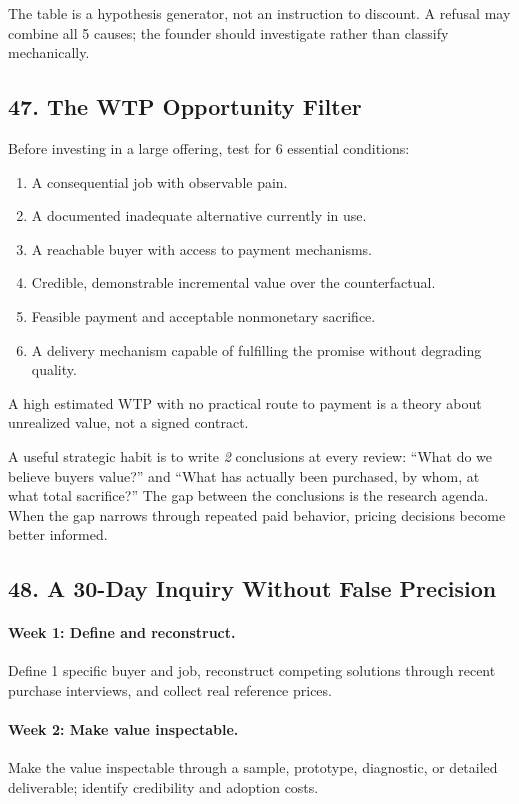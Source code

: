 The table is a hypothesis generator, not an instruction to discount. A refusal may combine all 5 causes; the founder should investigate rather than classify mechanically.

\subsection*{47. The WTP Opportunity Filter}

Before investing in a large offering, test for 6 essential conditions:
\begin{enumerate}
\item A consequential job with observable pain.
\item A documented inadequate alternative currently in use.
\item A reachable buyer with access to payment mechanisms.
\item Credible, demonstrable incremental value over the counterfactual.
\item Feasible payment and acceptable nonmonetary sacrifice.
\item A delivery mechanism capable of fulfilling the promise without degrading quality.
\end{enumerate}

A high estimated WTP with no practical route to payment is a theory about unrealized value, not a signed contract.

A useful strategic habit is to write \emph{2} conclusions at every review: ``What do we believe buyers value?'' and ``What has actually been purchased, by whom, at what total sacrifice?'' The gap between the conclusions is the research agenda. When the gap narrows through repeated paid behavior, pricing decisions become better informed.

\subsection*{48. A 30-Day Inquiry Without False Precision}

\paragraph*{Week 1: Define and reconstruct.} Define 1 specific buyer and job, reconstruct competing solutions through recent purchase interviews, and collect real reference prices.

\paragraph*{Week 2: Make value inspectable.} Make the value inspectable through a sample, prototype, diagnostic, or detailed deliverable; identify credibility and adoption costs.


